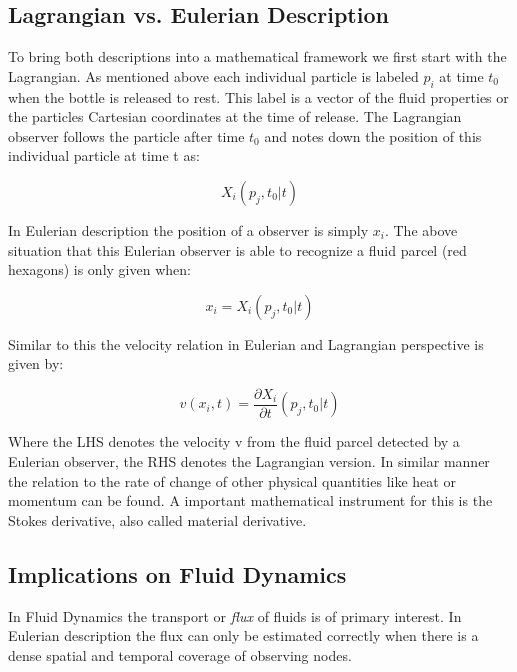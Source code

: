 \subsection{Lagrangian vs. Eulerian Description}
To bring both descriptions into a mathematical framework we first start with the Lagrangian. As mentioned above each individual particle is labeled $p_{i}$ at time $t_{0}$ when the bottle is released to rest. This label is a vector of the fluid properties or the particles Cartesian coordinates at the time of release. The Lagrangian observer follows the particle after time $t_{0}$ and notes down the position of this individual particle at time t as:

\begin{equation}
X_{i}(p_{j}, t_{0} | t)
\end{equation}

In Eulerian description the position of a observer is simply $x_{i}$. The above situation that this Eulerian observer is able to recognize a fluid parcel (red hexagons) is only given when:

\begin{equation}
x_{i} = X_{i}(p_{j}, t_{0} | t)
\end{equation}

Similar to this the velocity relation in Eulerian and Lagrangian perspective is given by:

\begin{equation}
v(x_{i},t) = \frac{\partial X_{i}}{\partial t} (p_{j}, t_{0} | t)
\end{equation}

Where the LHS denotes the velocity v from the fluid parcel detected by a Eulerian observer, the RHS denotes the Lagrangian version. In similar manner the relation to the rate of change of other physical quantities like heat or momentum can be found. A important mathematical instrument for this is the Stokes derivative, also called material derivative.

\subsection{Implications on Fluid Dynamics}

In Fluid Dynamics the transport or \emph{flux} of fluids is of primary interest. In Eulerian description the flux can only be estimated correctly when there is a dense spatial and temporal coverage of observing nodes.

